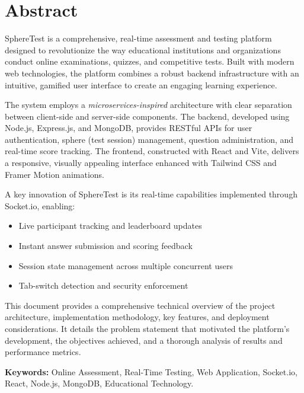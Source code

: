 \documentclass[12pt,a4paper]{report}
\begin{document}
\chapter*{Abstract}

SphereTest is a comprehensive, real-time assessment and testing platform designed to revolutionize the way educational institutions and organizations conduct online examinations, quizzes, and competitive tests. Built with modern web technologies, the platform combines a robust backend infrastructure with an intuitive, gamified user interface to create an engaging learning experience.

The system employs a \textit{microservices-inspired} architecture with clear separation between client-side and server-side components. The backend, developed using Node.js, Express.js, and MongoDB, provides RESTful APIs for user authentication, sphere (test session) management, question administration, and real-time score tracking. The frontend, constructed with React and Vite, delivers a responsive, visually appealing interface enhanced with Tailwind CSS and Framer Motion animations.

A key innovation of SphereTest is its real-time capabilities implemented through Socket.io, enabling:
\begin{itemize}[left=0pt]
  \item Live participant tracking and leaderboard updates
  \item Instant answer submission and scoring feedback
  \item Session state management across multiple concurrent users
  \item Tab-switch detection and security enforcement
\end{itemize}

This document provides a comprehensive technical overview of the project architecture, implementation methodology, key features, and deployment considerations. It details the problem statement that motivated the platform's development, the objectives achieved, and a thorough analysis of results and performance metrics.

\textbf{Keywords:} Online Assessment, Real-Time Testing, Web Application, Socket.io, React, Node.js, MongoDB, Educational Technology.

\cleardoublepage

\end{document}
